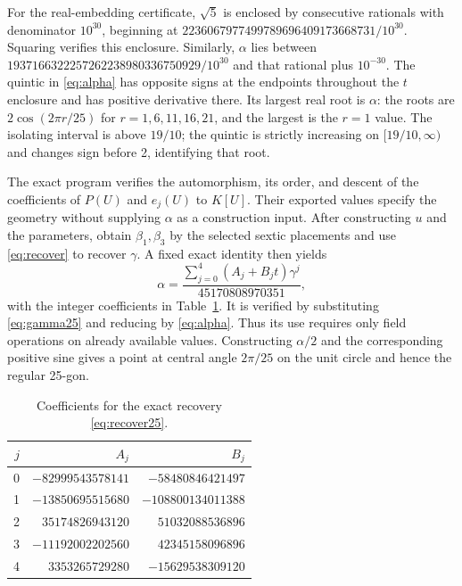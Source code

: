 \documentclass[noproofs]{rmj-public}
\theoremstyle{definition}
\numberwithin{equation}{section}
\begin{document}
For the real-embedding certificate, $\sqrt5$ is enclosed by consecutive
rationals with denominator $10^{30}$, beginning at
$2236067977499789696409173668731/10^{30}$. Squaring verifies this
enclosure. Similarly, $\alpha$ lies between
$1937166322257262238980336750929/10^{30}$ and that rational plus
$10^{-30}$. The quintic in \eqref{eq:alpha} has opposite signs at the
endpoints throughout the $t$ enclosure and has positive derivative
there. Its largest real root is $\alpha$: the roots are
$2\cos(2\pi r/25)$ for $r=1,6,11,16,21$, and the largest is the
$r=1$ value. The isolating interval is above $19/10$; the quintic is
strictly increasing on $[19/10,\infty)$ and changes sign before 2,
identifying that root.

The exact program verifies the automorphism, its order, and descent of
the coefficients of $P(U)$ and $e_j(U)$ to $K[U]$. Their exported values
specify the geometry without supplying $\alpha$ as a construction input.
After constructing $u$ and the parameters, obtain $\beta_1,\beta_3$
by the selected sextic placements and use \eqref{eq:recover} to recover
$\gamma$. A fixed exact identity then yields
\begin{equation}\label{eq:recover25}
\alpha=\frac{\sum_{j=0}^4(A_j+B_jt)\gamma^j}{45170808970351},
\end{equation}
with the integer coefficients in Table~\ref{tab:recover}. It is verified
by substituting \eqref{eq:gamma25} and reducing by \eqref{eq:alpha}.
Thus its use requires only field operations on already available values.
Constructing $\alpha/2$ and the corresponding positive sine gives a point
at central angle $2\pi/25$ on the unit circle and hence the regular
25-gon.

\begin{table}[ht]
\centering
\caption{Coefficients for the exact recovery \eqref{eq:recover25}.}\label{tab:recover}
\begin{tabular}{rrr}
\toprule $j$&$A_j$&$B_j$\\\midrule
0&$-82999543578141$&$-58480846421497$\\
1&$-13850695515680$&$-108800134011388$\\
2&$35174826943120$&$51032088536896$\\
3&$-11192002202560$&$42345158096896$\\
4&$3353265729280$&$-15629538309120$\\\bottomrule
\end{tabular}
\end{table}
\end{document}
